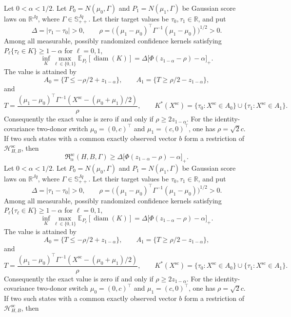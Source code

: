 Let \(0<\alpha<1/2\). Let \(P_0=N(\mu_0,\Gamma)\) and \(P_1=N(\mu_1,\Gamma)\) be Gaussian score laws on \(\mathbb R^{Jq}\), where \(\Gamma\in\mathbb S_{++}^{Jq}\). Let their target values be \(\tau_0,\tau_1\in\mathbb R\), and put
\[
 \Delta=|\tau_1-\tau_0|>0,
 \qquad
 \rho=\bigl((\mu_1-\mu_0)^{\top}\Gamma^{-1}(\mu_1-\mu_0)\bigr)^{1/2}>0.
\]
Among all measurable, possibly randomized confidence kernels satisfying \(P_\ell\{\tau_\ell\in K\}\geq1-\alpha\) for \(\ell=0,1\),
\[
 \inf_K\max_{\ell\in\{0,1\}}
 \mathbb E_{P_\ell}[\operatorname{diam}(K)]
 =\Delta\bigl[\Phi(z_{1-\alpha}-\rho)-\alpha\bigr]_+.
\]
The value is attained by
\[
 A_0=\{T\leq-\rho/2+z_{1-\alpha}\},
 \qquad
 A_1=\{T\geq\rho/2-z_{1-\alpha}\},
\]
and
\[
 T=\frac{(\mu_1-\mu_0)^{\top}\Gamma^{-1}
 (X^{\mathrm{sc}}-(\mu_0+\mu_1)/2)}{\rho},
 \qquad
 K^*(X^{\mathrm{sc}})
 =\{\tau_0:X^{\mathrm{sc}}\in A_0\}
 \cup\{\tau_1:X^{\mathrm{sc}}\in A_1\}.
\]
Consequently the exact value is zero if and only if \(\rho\geq2z_{1-\alpha}\). For the identity-covariance two-donor switch \(\mu_0=(0,c)^{\top}\) and \(\mu_1=(c,0)^{\top}\), one has \(\rho=\sqrt{2}c\). If two such states with a common exactly observed vector \(b\) form a restriction of \(\mathcal H_{H,B}^{\mathrm{sc}}\), then
\[
 \mathfrak R_{\alpha}^{\mathrm{sc}}(H,B,\Gamma)
 \geq
 \Delta\bigl[\Phi(z_{1-\alpha}-\rho)-\alpha\bigr]_+.
\]
Let \(0<\alpha<1/2\). Let \(P_0=N(\mu_0,\Gamma)\) and \(P_1=N(\mu_1,\Gamma)\) be Gaussian score laws on \(\mathbb R^{Jq}\), where \(\Gamma\in\mathbb S_{++}^{Jq}\). Let their target values be \(\tau_0,\tau_1\in\mathbb R\), and put
\[
 \Delta=|\tau_1-\tau_0|>0,
 \qquad
 \rho=\bigl((\mu_1-\mu_0)^{\top}\Gamma^{-1}(\mu_1-\mu_0)\bigr)^{1/2}>0.
\]
Among all measurable, possibly randomized confidence kernels satisfying \(P_\ell\{\tau_\ell\in K\}\geq1-\alpha\) for \(\ell=0,1\),
\[
 \inf_K\max_{\ell\in\{0,1\}}
 \mathbb E_{P_\ell}[\operatorname{diam}(K)]
 =\Delta\bigl[\Phi(z_{1-\alpha}-\rho)-\alpha\bigr]_+.
\]
The value is attained by
\[
 A_0=\{T\leq-\rho/2+z_{1-\alpha}\},
 \qquad
 A_1=\{T\geq\rho/2-z_{1-\alpha}\},
\]
and
\[
 T=\frac{(\mu_1-\mu_0)^{\top}\Gamma^{-1}
 (X^{\mathrm{sc}}-(\mu_0+\mu_1)/2)}{\rho},
 \qquad
 K^*(X^{\mathrm{sc}})
 =\{\tau_0:X^{\mathrm{sc}}\in A_0\}
 \cup\{\tau_1:X^{\mathrm{sc}}\in A_1\}.
\]
Consequently the exact value is zero if and only if \(\rho\geq2z_{1-\alpha}\). For the identity-covariance two-donor switch \(\mu_0=(0,c)^{\top}\) and \(\mu_1=(c,0)^{\top}\), one has \(\rho=\sqrt{2}c\). If two such states with a common exactly observed vector \(b\) form a restriction of \(\mathcal H_{H,B}^{\mathrm{sc}}\), then
